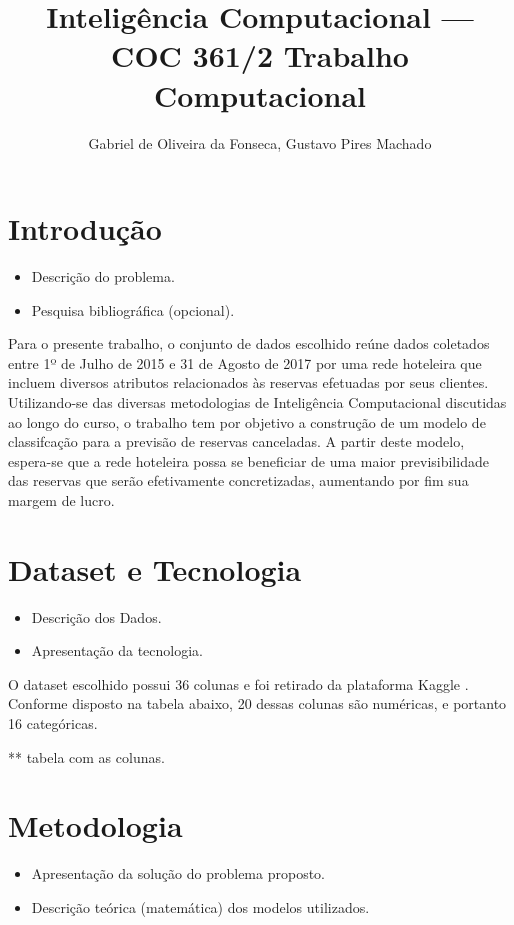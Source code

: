 \documentclass{homework}
\title{Inteligência Computacional --- COC 361\linebreak2021/2 \linebreak\linebreak Trabalho Computacional}
\author{Gabriel de Oliveira da Fonseca, Gustavo Pires Machado}
\begin{document}
\maketitle

\pagebreak

\section{Introdução}

\begin{itemize}
\color{red}
    \item Descrição do problema.
    \item Pesquisa bibliográfica (opcional).
\end{itemize}

Para o presente trabalho, o conjunto de dados escolhido reúne dados coletados entre 1º de Julho de 2015 e 31 de Agosto
de 2017 por uma rede hoteleira que incluem diversos atributos relacionados às reservas efetuadas por seus clientes.
Utilizando-se das diversas metodologias de Inteligência Computacional discutidas ao longo do curso, o trabalho tem por
objetivo a construção de um modelo de classifcação para a previsão de reservas canceladas. A partir deste modelo,
espera-se que a rede hoteleira possa se beneficiar de uma maior previsibilidade das reservas que serão efetivamente
concretizadas, aumentando por fim sua margem de lucro.

\section{Dataset e Tecnologia}

\begin{itemize}
\color{red}
    \item Descrição dos Dados.
    \item Apresentação da tecnologia.
\end{itemize}

O dataset escolhido possui 36 colunas e foi retirado da plataforma Kaggle \cite{kaggle}. Conforme disposto na tabela
abaixo, 20 dessas colunas são numéricas, e portanto 16 categóricas.

** tabela com as colunas.

\section{Metodologia}

\begin{itemize}
    \color{red}
        \item Apresentação da solução do problema proposto.
        \item Descrição teórica (matemática) dos modelos utilizados.
\end{itemize}
\end{document}
